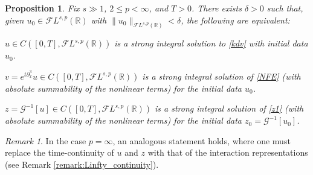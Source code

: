 \documentclass[%
11pt,  reqno]{amsart}
\newcommand{\5}{\textup{V}}
\newcommand{\noi}{\noindent}
\newcommand{\FL}{\mathcal{F} L}
\newcommand{\dx}{\partial_x}
\newtheorem{proposition}[theorem]{Proposition}
\theoremstyle{remark}
\newtheorem{remark}[theorem]{Remark}
\newcommand{\R}{\mathbb{R}}
\newcommand{\Gc}{\mathcal{G}}
\numberwithin{equation}{section}
\numberwithin{theorem}{section}
\begin{document}
\begin{proposition}\label{prop:equivalencia}
Fix $s\gg 1$, $2\le p < \infty$, and $T>0$. There exists $\delta>0$ such that, given $u_0\in \FL^{s,p}(\R)$ with $\|u_0\|_{\FL^{s,p}(\R)}<\delta$, the following are equivalent:

\smallskip
\noi{\rm(i)} $u\in C([0,T], \FL^{s,p}(\R))$ is a strong integral solution to  \eqref{kdv} with initial data $u_0$.

\smallskip
\noi{\rm(ii)} $v=e^{t\dx^3}u\in C([0,T], \FL^{s,p}(\R))$ is a strong integral solution of \eqref{NFE} (with absolute summability of the nonlinear terms) for the initial data $u_0$.

\smallskip
\noi{\rm(iii)} $z=\Gc^{-1}[u]\in C([0,T], \FL^{s,p}(\R))$ is a strong integral solution of \eqref{z1} (with absolute summability of the nonlinear terms) for the initial data  $z_0=\Gc^{-1}[u_0]$.

\end{proposition}

\begin{remark}
    In the case $p=\infty$, an analogous statement holds, where one must replace the time-continuity of $u$ and $z$ with that of the interaction representations (see Remark \ref{remark:Linfty_continuity}).
\end{remark}
\end{document}
